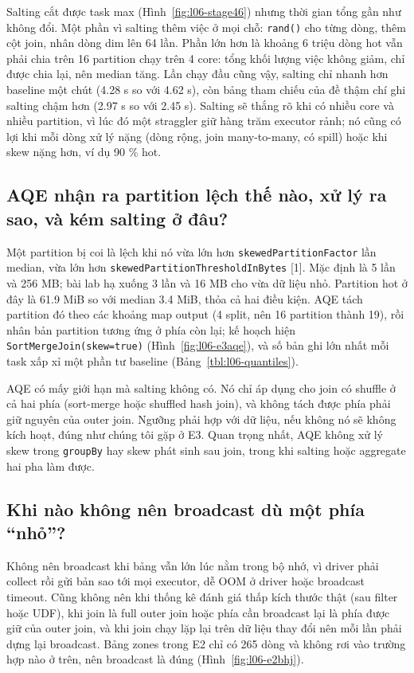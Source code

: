\documentclass[
  12pt,
  a4paper,
]{report}
\begin{document}
Salting cắt được task max (Hình~\ref{fig:l06-stage46}) nhưng thời gian
tổng gần như không đổi. Một phần vì salting thêm việc ở mọi chỗ:
\texttt{rand()} cho từng dòng, thêm cột join, nhân dòng dim lên 64 lần.
Phần lớn hơn là khoảng 6 triệu dòng hot vẫn phải chia trên 16 partition
chạy trên 4 core: tổng khối lượng việc không giảm, chỉ được chia lại,
nên median tăng. Lần chạy đầu cũng vậy, salting chỉ nhanh hơn baseline
một chút (4.28 s so với 4.62 s), còn bảng tham chiếu của đề thậm chí ghi
salting chậm hơn (2.97 s so với 2.45 s). Salting sẽ thắng rõ khi có
nhiều core và nhiều partition, vì lúc đó một straggler giữ hàng trăm
executor rảnh; nó cũng có lợi khi mỗi dòng xử lý nặng (dòng rộng, join
many-to-many, có spill) hoặc khi skew nặng hơn, ví dụ 90 \% hot.

\subsection{AQE nhận ra partition lệch thế nào, xử lý ra sao, và kém
salting ở đâu?}\label{sec:l06-q4}

Một partition bị coi là lệch khi nó vừa lớn hơn
\texttt{skewedPartitionFactor}\allowbreak{} lần median, vừa lớn hơn
\texttt{skewedPartitionThresholdInBytes}\allowbreak{} {[}1{]}. Mặc định
là 5 lần và 256 MB; bài lab hạ xuống 3 lần và 16 MB cho vừa dữ liệu nhỏ.
Partition hot ở đây là 61.9 MiB so với median 3.4 MiB, thỏa cả hai điều
kiện. AQE tách partition đó theo các khoảng map output (4 split, nên 16
partition thành 19), rồi nhân bản partition tương ứng ở phía còn lại; kế
hoạch hiện
\texttt{SortMergeJoin(skew=}\allowbreak{}\texttt{true)}\allowbreak{}
(Hình~\ref{fig:l06-e3aqe}), và số bản ghi lớn nhất mỗi task xấp xỉ một
phần tư baseline (Bảng~\ref{tbl:l06-quantiles}).

AQE có mấy giới hạn mà salting không có. Nó chỉ áp dụng cho join có
shuffle ở cả hai phía (sort-merge hoặc shuffled hash join), và không
tách được phía phải giữ nguyên của outer join. Ngưỡng phải hợp với dữ
liệu, nếu không nó sẽ không kích hoạt, đúng như chúng tôi gặp ở E3. Quan
trọng nhất, AQE không xử lý skew trong \texttt{groupBy} hay skew phát
sinh sau join, trong khi salting hoặc aggregate hai pha làm được.

\subsection{Khi nào không nên broadcast dù một phía
``nhỏ''?}\label{sec:l06-q5}

Không nên broadcast khi bảng vẫn lớn lúc nằm trong bộ nhớ, vì driver
phải collect rồi gửi bản sao tới mọi executor, dễ OOM ở driver hoặc
broadcast timeout. Cũng không nên khi thống kê đánh giá thấp kích thước
thật (sau filter hoặc UDF), khi join là full outer join hoặc phía cần
broadcast lại là phía được giữ của outer join, và khi join chạy lặp lại
trên dữ liệu thay đổi nên mỗi lần phải dựng lại broadcast. Bảng zones
trong E2 chỉ có 265 dòng và không rơi vào trường hợp nào ở trên, nên
broadcast là đúng (Hình~\ref{fig:l06-e2bhj}).
\end{document}
